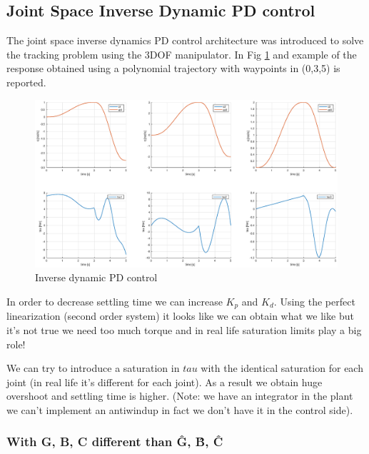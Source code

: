 \documentclass[a4paper,12pt]{article}
\begin{document}
\newpage 
\subsection{Joint Space Inverse Dynamic PD control}

The joint space inverse dynamics PD control architecture was introduced to solve the tracking problem using the 3DOF manipulator. In Fig \ref{fig:inv_dyn} and example of the response obtained using a polynomial trajectory with waypoints in (0,3,5) is reported.
\begin{figure}[H]
    \begin{center}
        \hspace*{-4.5cm}
        \includegraphics[scale=0.5]{images/inv_dyn.eps}
    \end{center}
    \caption{Inverse dynamic PD control}
    \label{fig:inv_dyn}
\end{figure}

In order to decrease settling time we can increase $K_p$ and $K_d$. Using the perfect linearization (second order system) it looks like we can obtain what we like but it's not true we need too much torque and in real life saturation limits play a big role!

We can try to introduce a saturation in $tau$ with the identical saturation for each joint (in real life it's different for each joint). As a result we obtain huge overshoot and settling time is higher. (Note: we have an integrator in the plant we can't implement an antiwindup in fact we don't have it in the control side).

\subsubsection{With G, B, C different than \^{G}, \^{B}, \^{C}}
\end{document}
